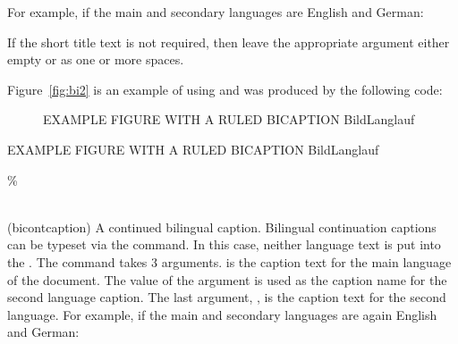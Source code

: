  For example, if the main and secondary languages are English and German: 
\begin{lcode}
\end{lcode}
If the short title text is not required, then leave the appropriate
argument either empty or as one or more spaces.

 Figure~\ref{fig:bi2} is an example of using \cmd{\bicaption} and was 
 produced by the following code:
\begin{lcode}
\begin{figure}
\centering
   EXAMPLE FIGURE WITH A RULED BICAPTION
\precaption{\rule{\linewidth}{0.4pt}\par}
\midbicaption{\precaption{}%
              \postcaption{\rule{\linewidth}{0.4pt}}}
%
    {Bild}{Langlauf}
\end{figure}
\end{lcode}

 \begin{shadefigure}
 EXAMPLE FIGURE WITH A RULED BICAPTION
 \precaption{\rule{\linewidth}{0.4pt}\par}
 \midbicaption{\precaption{}%
               \postcaption{\rule{\linewidth}{0.4pt}}}
    {Bild}{Langlauf}
 \end{shadefigure}

\begin{syntax}
\cmd{\bicontcaption}\% \\
                     \\
\end{syntax}
\glossary(bicontcaption)%
  {}%
  {A continued bilingual caption.}
 Bilingual continuation captions can be typeset via the \cmd{\bicontcaption} 
command. In this case, neither language text is put into the \listofx. 
The command takes 3 arguments.
 is the caption text for
the main language of the document. The value of the  argument
is used as the caption name for the second language caption. The last
argument, , is the caption text
for the second language.
For example, if the main and secondary languages
are again English and German:
\begin{lcode}
\end{lcode}

